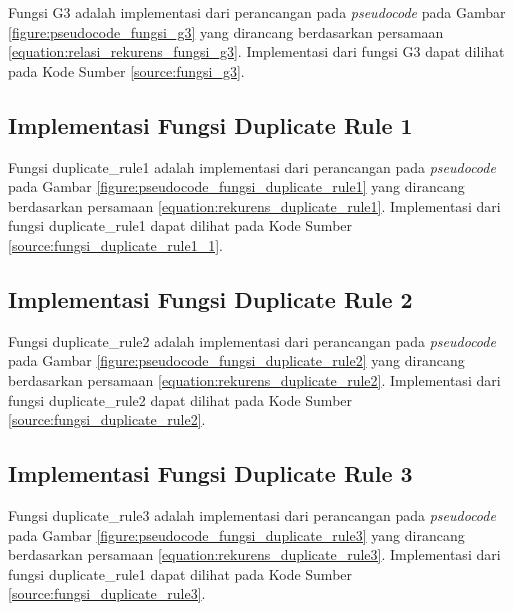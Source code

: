 Fungsi G3 adalah implementasi dari perancangan pada \textit{pseudocode} pada Gambar \ref{figure:pseudocode_fungsi_g3} yang dirancang berdasarkan persamaan \ref{equation:relasi_rekurens_fungsi_g3}. Implementasi dari fungsi G3 dapat dilihat pada Kode Sumber \ref{source:fungsi_g3}.




\subsection{Implementasi Fungsi Duplicate Rule 1}

Fungsi duplicate\_rule1 adalah implementasi dari perancangan pada \textit{pseudocode} pada Gambar \ref{figure:pseudocode_fungsi_duplicate_rule1} yang dirancang berdasarkan persamaan \ref{equation:rekurens_duplicate_rule1}. Implementasi dari fungsi duplicate\_rule1 dapat dilihat pada Kode Sumber \ref{source:fungsi_duplicate_rule1_1}.

\begin{minipage}{\linewidth}

\end{minipage}

\subsection{Implementasi Fungsi Duplicate Rule 2}

Fungsi duplicate\_rule2 adalah implementasi dari perancangan pada \textit{pseudocode} pada Gambar \ref{figure:pseudocode_fungsi_duplicate_rule2} yang dirancang berdasarkan persamaan \ref{equation:rekurens_duplicate_rule2}. Implementasi dari fungsi duplicate\_rule2 dapat dilihat pada Kode Sumber \ref{source:fungsi_duplicate_rule2}.



\subsection{Implementasi Fungsi Duplicate Rule 3}

Fungsi duplicate\_rule3 adalah implementasi dari perancangan pada \textit{pseudocode} pada Gambar \ref{figure:pseudocode_fungsi_duplicate_rule3} yang dirancang berdasarkan persamaan \ref{equation:rekurens_duplicate_rule3}. Implementasi dari fungsi duplicate\_rule1 dapat dilihat pada Kode Sumber \ref{source:fungsi_duplicate_rule3}.
\\
